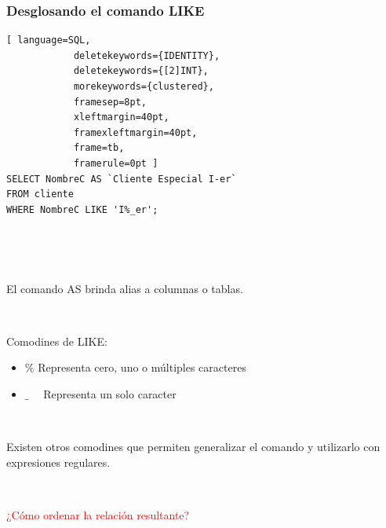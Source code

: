 \documentclass[
	10pt, %
	aspectratio=169, %
]{beamer}
\begin{document}
\begin{frame}[fragile]
	
	\frametitle{Desglosando el comando LIKE}
	
			\begin{lstlisting}[ language=SQL,
			deletekeywords={IDENTITY},
			deletekeywords={[2]INT},
			morekeywords={clustered},
			framesep=8pt,
			xleftmargin=40pt,
			framexleftmargin=40pt,
			frame=tb,
			framerule=0pt ]
SELECT NombreC AS `Cliente Especial I-er`
FROM cliente 
WHERE NombreC LIKE 'I%_er';
\end{lstlisting}

	\ 
	
	\ 
	
	El comando \textcolor{codepurple}{AS} brinda alias a columnas o tablas.
	
	\pause
	
	\ 
	
	Comodines de  \textcolor{codepurple}{LIKE}: 
	\begin{itemize}
		
		\item \textcolor{codepurple}{$\%$} Representa cero, uno o múltiples caracteres
		
		\item \textcolor{codepurple}{\textbf{$\_$}} \ \ Representa un solo caracter
					
	\end{itemize}
	
	\pause 
	
	\ 
	
	Existen otros comodines que permiten generalizar el comando y utilizarlo con expresiones regulares.
	
	\pause
	
	\ 
	
	\textcolor{red}{¿Cómo ordenar la relación resultante?}
	
\end{frame}

\end{document}
